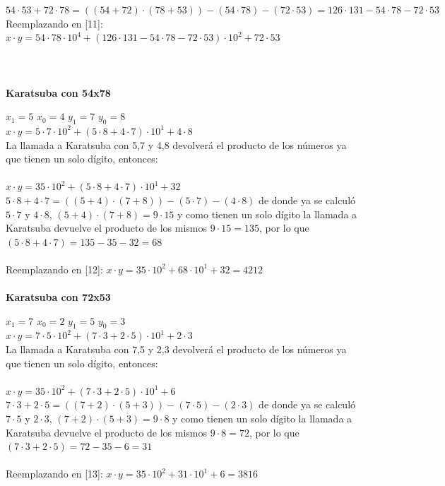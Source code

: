 \documentclass[titlepage,a4paper]{article}
\begin{document}
$54\cdot 53 + 72 \cdot 78 = ((54+72)\cdot (78+53)) - (54\cdot 78) - (72\cdot 53) = 126 \cdot 131 - 54\cdot 78 - 72\cdot 53 $ \\

Reemplazando en [11]: \qquad $ x\cdot y= 54 \cdot 78 \cdot 10^4 + (126 \cdot 131 - 54\cdot 78 - 72\cdot 53)\cdot 10^2 + 72\cdot 53 $ \\ \\ \\ \\


\textbf{Karatsuba con 54x78} \par
\qquad $x_1=5$ \quad $x_0=4$ \quad $y_1=7$ \quad $y_0=8$ \\
$x\cdot y= 5 \cdot 7 \cdot 10^2 + (5\cdot 8 + 4 \cdot 7)\cdot 10^1 + 4\cdot 8 $ \\

La llamada a Karatsuba con 5,7 y 4,8 devolverá el producto de los números ya que tienen un solo dígito, entonces: \\ \\
$x\cdot y = 35 \cdot 10^2 + (5\cdot 8 + 4 \cdot 7)\cdot 10^1 + 32 $ \qquad [12] \\

$5 \cdot8 + 4\cdot7 = ((5+4)\cdot (7+8)) - (5\cdot 7) - (4\cdot 8) $ de donde ya se calculó $5\cdot 7$ y $4\cdot 8$, $(5+4)\cdot (7+8) = 9\cdot15$ y como tienen un solo dígito la llamada a Karatsuba devuelve el producto de los mismos $9\cdot15=135$, por lo que $ (5\cdot 8 + 4 \cdot 7) = 135 - 35 - 32 = 68 $ \\ \\ 
Reemplazando en [12]: \qquad $ x\cdot y = 35 \cdot 10^2 + 68\cdot 10^1 + 32 = 4212 $ \\ \\


\textbf{Karatsuba con 72x53} \par
\qquad $x_1=7$ \quad $x_0=2$ \quad $y_1=5$ \quad $y_0=3$ \\
$x\cdot y= 7 \cdot 5 \cdot 10^2 + (7\cdot 3 + 2 \cdot 5)\cdot 10^1 + 2\cdot 3 $ \\

La llamada a Karatsuba con 7,5 y 2,3 devolverá el producto de los números ya que tienen un solo dígito, entonces: \\ \\
$x\cdot y = 35 \cdot 10^2 + (7\cdot 3 + 2 \cdot 5)\cdot 10^1 + 6 $ \qquad [13] \\

$7 \cdot3 + 2\cdot5 = ((7+2)\cdot (5+3)) - (7\cdot 5) - (2\cdot 3)$ de donde ya se calculó $7\cdot 5$ y $2\cdot 3$, $(7+2)\cdot (5+3) = 9\cdot8$ y como tienen un solo dígito la llamada a Karatsuba devuelve el producto de los mismos $9\cdot8=72$, por lo que $ (7\cdot 3 + 2 \cdot 5) = 72 - 35 - 6 = 31 $ \\ \\ 
Reemplazando en [13]: \qquad $ x\cdot y = 35 \cdot 10^2 + 31\cdot 10^1 + 6 = 3816 $ \\ \\
\end{document}
